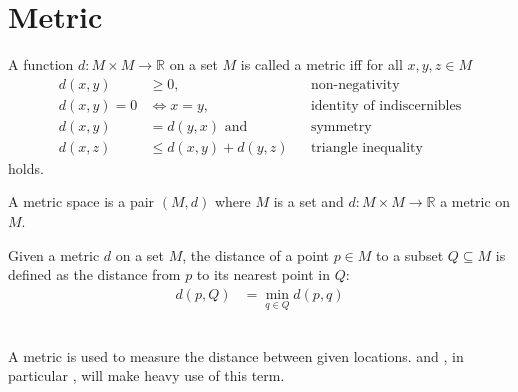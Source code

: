\section{Metric}
	\begin{mydef}\label{metric}
		A function $d: M \times M \to \mathbb{R}$ on a set $M$ is called a \textnormal{metric} iff for all $x, y, z \in M$
		\begin{align*}
			d(x, y)	&\ge 0,			&&\text{non-negativity}\\
			d(x, y) = 0	&\Leftrightarrow x = y,	&&\text{identity of indiscernibles}\\
			d(x, y)	&= d(y, x) \text{ and }	&&\text{symmetry}\\
			d(x, z)	&\le d(x, y) + d(y, z)	&&\text{triangle inequality}
		\end{align*}
		holds.
	\end{mydef}
	\begin{mydef}\label{metricSpace}
		A \textnormal{metric space} is a pair $(M, d)$ where $M$ is a set
		and $d: M \times M \to \mathbb{R}$ a metric on $M$.
	\end{mydef}
	\begin{mydef}\label{metricSet}
		Given a metric $d$ on a set $M$, the distance of a point $p \in M$ to a subset $Q \subseteq M$
		is defined as the distance from $p$ to its nearest point in $Q$:
		\begin{align*}
			d(p, Q)	&= \min_{q \in Q} d(p, q)
		\end{align*}
	\end{mydef}\quad\\
	A metric is used to measure the distance between given locations. 
	and , in particular , will make heavy use of this term.
	
